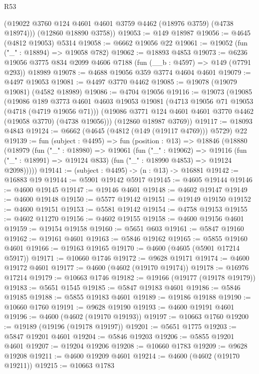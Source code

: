 \begin{lexlean}{R53}
\begin{coremodule}
        (@19022 @3760 @124 @4601 @4601 @3759 @4462 (@18976 @3759) (@4738 @18974)))
      (@12860 @18890 @3758))
@19053 := @149 @18987
@19056 := @4645 (@4812 @19053) @5314
@19058 := @6662 @19056 @22
@19061 := @19052 (fun ("_" : @18894) => @19058 @782)
@19062 := @18893 @4853
@19073 := @6236 @19056 @3775 @834 @2099 @4606 @7188 (fun (__b : @4597) => @149 (@7791 @293)) @18989
@19078 := @4688 @19056 @359 @3774 @4604 @4601
@19079 := @4497 @19053
@19081 := @4497 @3770 @4462
@19085 := @19078 (@19079 @19081) (@4582 @18989)
@19086 := @4704 @19056
@19116 := @19073
    (@19085
      (@19086
        @189
        @3773
        @4601
        @4603
        @19053
        @19081
        (@4713 @19056 @71 @19053 (@4718 (@4719 @19056 @71)))
        (@19086 @3771 @124 @4601 @4601 @3770 @4462 (@19058 @3770) (@4738 @19056)))
      (@12860 @18987 @3769))
@19117 := @18093 @4843
@19124 := @6662 (@4645 (@4812 (@149 (@19117 @4769))) @5729) @22
@19139 := fun (subject : @4495) =>
  fun (position : @13) =>
  @18846
    (@18880
      (@18979
        (fun ("_" : @18980) =>
        @19061
          (fun ("_" : @19062) =>
          @19116 (fun ("_" : @18991) => @19124 @833) (fun ("_" : @18990 @4853) => @19124 @2098)))))
@19141 := (subject : @4495) -> (n : @13) -> @16881
@19142 := @16883 @19
@19144 := @5901 @19142 @5917
@19145 := @4605 @19144
@19146 := @4600 @19145
@19147 := @19146 @4601
@19148 := @4602 @19147
@19149 := @4600 @19148
@19150 := @5577 @19142
@19151 := @19149 @19150
@19152 := @4600 @19151
@19153 := @5581 @19142
@19154 := @4758 @19153
@19155 := @4602 @11270
@19156 := @4602 @19155
@19158 := @4600 @19156 @4601
@19159 := @19154 @19158
@19160 := @5651 @603
@19161 := @5847 @19160
@19162 := @19161 @4601
@19163 := @5846 @19162
@19165 := @5855 @19160 @4601
@19166 := @19163 @19165
@19170 := @4600 (@4605 (@5901 @17214 @5917))
@19171 := @10660 @1746
@19172 := @9628 @19171
@19174 := @4600 @19172 @4601
@19177 := @4600 (@4602 (@19170 @19174))
@19178 := @16976 @17214
@19179 := @10663 @1746
@19182 := @19166 (@19177 (@19178 @19179))
@19183 := @5651 @1545
@19185 := @5847 @19183 @4601
@19186 := @5846 @19185
@19188 := @5855 @19183 @4601
@19189 := @19186 @19188
@19190 := @10660 @1760
@19191 := @9628 @19190
@19193 := @4600 @19191 @4601
@19196 := @4600 (@4602 (@19170 @19193))
@19197 := @10663 @1760
@19200 := @19189 (@19196 (@19178 @19197))
@19201 := @5651 @1775
@19203 := @5847 @19201 @4601
@19204 := @5846 @19203
@19206 := @5855 @19201 @4601
@19207 := @19204 @19206
@19208 := @10660 @1783
@19209 := @9628 @19208
@19211 := @4600 @19209 @4601
@19214 := @4600 (@4602 (@19170 @19211))
@19215 := @10663 @1783

\end{coremodule}
\end{lexlean}
